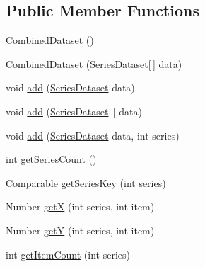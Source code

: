 \subsection*{Public Member Functions}
\begin{DoxyCompactItemize}
\item 
\mbox{\hyperlink{classorg_1_1jfree_1_1data_1_1general_1_1_combined_dataset_a4f3f3cd4bbf412bb84bcb5e08e6e67f8}{Combined\+Dataset}} ()
\item 
\mbox{\hyperlink{classorg_1_1jfree_1_1data_1_1general_1_1_combined_dataset_a4bdbc33ad5f47b8a83611f834e367038}{Combined\+Dataset}} (\mbox{\hyperlink{interfaceorg_1_1jfree_1_1data_1_1general_1_1_series_dataset}{Series\+Dataset}}\mbox{[}$\,$\mbox{]} data)
\item 
void \mbox{\hyperlink{classorg_1_1jfree_1_1data_1_1general_1_1_combined_dataset_a4bfbe145c079542407e8b5e0f2a3aafb}{add}} (\mbox{\hyperlink{interfaceorg_1_1jfree_1_1data_1_1general_1_1_series_dataset}{Series\+Dataset}} data)
\item 
void \mbox{\hyperlink{classorg_1_1jfree_1_1data_1_1general_1_1_combined_dataset_a96821dfe0654378d89f9448e9676fcfa}{add}} (\mbox{\hyperlink{interfaceorg_1_1jfree_1_1data_1_1general_1_1_series_dataset}{Series\+Dataset}}\mbox{[}$\,$\mbox{]} data)
\item 
void \mbox{\hyperlink{classorg_1_1jfree_1_1data_1_1general_1_1_combined_dataset_a06aeb170099a39d4efc4bee76a954431}{add}} (\mbox{\hyperlink{interfaceorg_1_1jfree_1_1data_1_1general_1_1_series_dataset}{Series\+Dataset}} data, int series)
\item 
int \mbox{\hyperlink{classorg_1_1jfree_1_1data_1_1general_1_1_combined_dataset_ae0ddd62e77bd5ea626edd198b24884af}{get\+Series\+Count}} ()
\item 
Comparable \mbox{\hyperlink{classorg_1_1jfree_1_1data_1_1general_1_1_combined_dataset_a67b81a1692ca317f7f543c6cd5674e71}{get\+Series\+Key}} (int series)
\item 
Number \mbox{\hyperlink{classorg_1_1jfree_1_1data_1_1general_1_1_combined_dataset_ac323284fc0d4b04b2e725324c477fbe7}{getX}} (int series, int item)
\item 
Number \mbox{\hyperlink{classorg_1_1jfree_1_1data_1_1general_1_1_combined_dataset_a87e02aef2783486fbe4be09ae4f1e3bf}{getY}} (int series, int item)
\item 
int \mbox{\hyperlink{classorg_1_1jfree_1_1data_1_1general_1_1_combined_dataset_a2c07e48f3cfd8b379856b7729c485273}{get\+Item\+Count}} (int series)
\item 

\end{DoxyCompactItemize}
